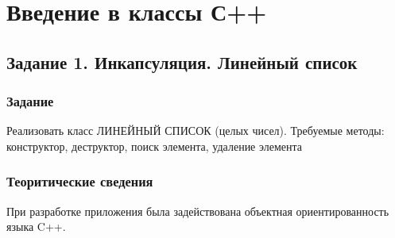 \documentclass[12pt,a4paper]{report}
\begin{document}
%

\chapter{Введение в классы С++}
\section{Задание 1. Инкапсуляция. Линейный список}
\subsection{Задание}
\hspace{\parindent}
Реализовать класс ЛИНЕЙНЫЙ СПИСОК (целых чисел). Требуемые методы: конструктор, деструктор,
поиск элемента, удаление элемента
\subsection{Теоритические сведения}
\hspace{\parindent}
При разработке приложения была задействована объектная ориентированность языка C++. 
\end{document}
